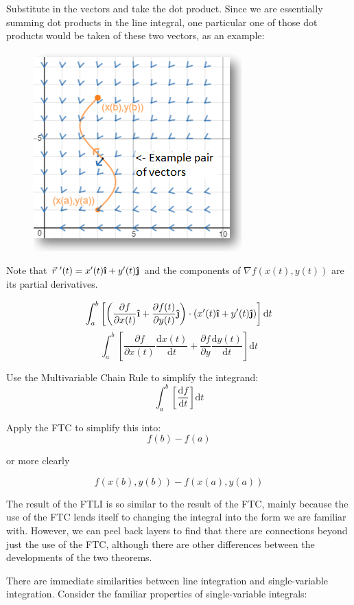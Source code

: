 \documentclass[11pt]{article}
\newcommand{\ihat}{\boldsymbol{\hat{\textbf{\i}}}}
\newcommand{\jhat}{\boldsymbol{\hat{\textbf{\j}}}}
\newcommand{\dr}{\vec{r}~^{\prime}(t)}
\newcommand{\dx}{x^{\prime}(t)}
\newcommand{\dy}{y^{\prime}(t)}
\begin{document}
Substitute in the vectors and take the dot product. Since we are essentially summing dot products in the line integral, one particular one of those dot products would be taken of these two vectors, as an example:

\begin{figure}[h]
\centering
\includegraphics[scale=0.75]{dotprod}
\end{figure}

 Note that $\dr=\dx\ihat+\dy\jhat$ and the components of $\nabla f(x(t),y(t))$ are its partial derivatives.

$$\int_a^b \left[ \left(\frac{\partial f}{\partial x(t)}\ihat+\frac{\partial f(t)}{\partial y(t)}\jhat\right)\cdot (\dx\ihat+\dy\jhat)\right]\mathrm{d}t$$
$$\int_a^b\left[\frac{\partial f}{\partial x(t)}\frac{\mathrm{d}x(t)}{\mathrm{d}t}+\frac{\partial f}{\partial y}\frac{\mathrm{d}y(t)}{\mathrm{d}t}\right]\mathrm{d}t$$

Use the Multivariable Chain Rule to simplify the integrand:
$$\int_a^b \left[\frac{\mathrm{d}f}{\mathrm{d}t}\right]\mathrm{d}t$$

Apply the FTC to simplify this into:
$$f(b)-f(a)$$
\begin{center}
or more clearly
\end{center}
$$f(x(b),y(b))-f(x(a),y(a))$$

The result of the FTLI is so similar to the result of the FTC, mainly because the use of the FTC lends itself to changing the integral into the form we are familiar with. However, we can peel back layers to find that there are connections beyond just the use of the FTC, although there are other differences between the developments of the two theorems.

There are immediate similarities between line integration and single-variable integration. Consider the familiar properties of single-variable integrals:
\end{document}
